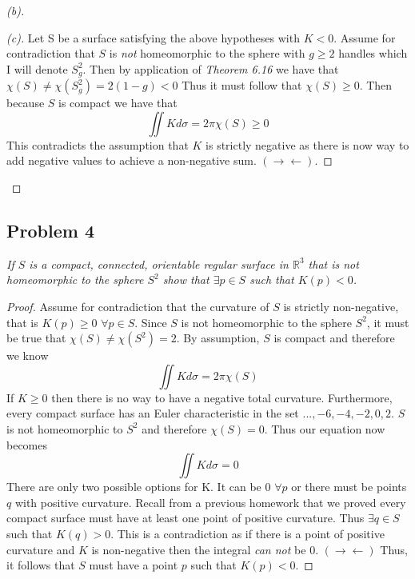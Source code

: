 \documentclass[a4paper, 11pt]{article}
\begin{document}
\begin{proof}[(b)]
		\begin{proof}[(c)]
			Let S be a surface satisfying the above hypotheses with $K<0$. Assume for contradiction that $S$ is \textit{not} homeomorphic to the sphere with $g\geq 2$ handles which I will denote $S_g^2$. Then by application of \textit{Theorem 6.16} we have that $\chi(S)\neq \chi(S_g^2) = 2(1-g) < 0$ Thus it must follow that $\chi(S) \geq 0$. Then because $S$ is compact we have that
				\begin{equation*}
					\iint K d\sigma = 2\pi\chi(S) \geq 0
				\end{equation*}
			This contradicts the assumption that $K$ is strictly negative as there is now way to add negative values to achieve a non-negative sum. $(\rightarrow \leftarrow)$. 
		\end{proof}
	\end{proof}
	
\subsection*{Problem 4} 
	\textit{If $S$ is a compact, connected, orientable regular surface in $\mathbb{R}^3$ that is not homeomorphic to the sphere $S^2$ show that $\exists p \in S$ such that $K(p)<0$. }
	
	\begin{proof}
		Assume for contradiction that the curvature of $S$ is strictly non-negative, that is $K(p)\geq 0$ $\forall p \in S$. Since $S$ is not homeomorphic to the sphere $S^2$, it must be true that $\chi(S) \neq \chi(S^2) = 2$. By assumption, $S$ is compact and therefore we know 
			\begin{equation*}
				\iint K d\sigma = 2\pi\chi(S)
			\end{equation*}
		If $K \geq 0$ then there is no way to have a negative total curvature. Furthermore, every compact surface has an Euler characteristic in the set ${..., -6, -4, -2, 0, 2}$. $S$ is not homeomorphic to $S^2$ and therefore $\chi(S)=0$. Thus our equation now becomes
			\begin{equation}
				\iint K d\sigma = 0 
			\end{equation}
		There are only two possible options for K. It can be 0 $\forall p$ or there must be points $q$ with positive curvature. Recall from a previous homework that we proved every compact surface must have at least one point of positive curvature. Thus $\exists q \in S$ such that $K(q) > 0$. This is a contradiction as if there is a point of positive curvature and $K$ is non-negative then the integral \textit{can not} be 0. $(\rightarrow \leftarrow)$ Thus, it follows that $S$ must have a point $p$ such that $K(p)<0$. 
	\end{proof}
	
\end{document}
